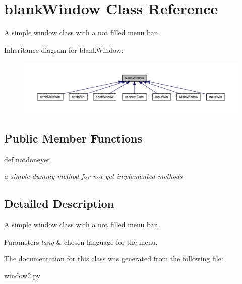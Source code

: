 \hypertarget{classgui_1_1window2_1_1blankWindow}{\section{blank\-Window Class Reference}
\label{classgui_1_1window2_1_1blankWindow}
}


A simple window class with a not filled menu bar.  




Inheritance diagram for blank\-Window\-:\nopagebreak
\begin{figure}[H]
\begin{center}
\leavevmode
\includegraphics[width=350pt]{classgui_1_1window2_1_1blankWindow__inherit__graph}
\end{center}
\end{figure}
\subsection*{Public Member Functions}
\begin{DoxyCompactItemize}
\item 
\hypertarget{classgui_1_1window2_1_1blankWindow_a615f3073891733337c33f599f89ec7ef}{def \hyperlink{classgui_1_1window2_1_1blankWindow_a615f3073891733337c33f599f89ec7ef}{notdoneyet}}\label{classgui_1_1window2_1_1blankWindow_a615f3073891733337c33f599f89ec7ef}

\begin{DoxyCompactList}\small\item\em a simple dummy method for not yet implemented methods \end{DoxyCompactList}\end{DoxyCompactItemize}


\subsection{Detailed Description}
A simple window class with a not filled menu bar. 


\begin{DoxyParams}{Parameters}
{\em lang} & chosen language for the menu. \\
\hline
\end{DoxyParams}


The documentation for this class was generated from the following file\-:\begin{DoxyCompactItemize}
\item 
\hyperlink{window2_8py}{window2.\-py}\end{DoxyCompactItemize}
